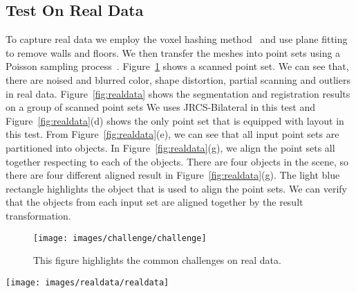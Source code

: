 \subsection{Test On Real Data}
To capture real data we employ the voxel hashing method~\cite{VXH} and use plane fitting to remove walls and floors. 
%
We then transfer the meshes into point sets using a Poisson sampling process~\cite{PossionSampling}.
%
Figure~\ref{fig:challenge} shows a scanned point set. We can see that, there are noised and blurred color, shape distortion, partial scanning and outliers in real data.
%
Figure~\ref{fig:realdata} shows the segmentation and registration results on a group of scanned point sets We uses JRCS-Bilateral in this test and Figure~\ref{fig:realdata}(d) shows the only point set that is equipped with layout in this test.
From Figure~\ref{fig:realdata}(e), we can see that all input point sets are partitioned into objects. In Figure~\ref{fig:realdata}(g), we align the point sets all together respecting to each of the objects. There are four objects in the scene, so there are four different aligned result in Figure~\ref{fig:realdata}(g). The light blue rectangle highlights the object that is used to align the point sets. We can verify that the objects from each input set are aligned together by the result transformation.
\begin{figure}
	\centering
	\texttt{[image: images/challenge/challenge]}
	\caption{\label{fig:challenge}This figure highlights the common challenges on real data.}
\end{figure}
\begin{figure*}
	\centering
	\texttt{[image: images/realdata/realdata]}
	\caption{\label{fig:realdata} Segmentation and registration on real data. (a) Scanned mesh using method in \cite{VXH}. (b) Remove walls and floors by plane fitting. (c) Sampled point set using \cite{PossionSampling}. (d) With roughly placed boxes on only one point set, the points are initially segmented in this one point set. Note that parts of the chair legs are segmented to the table due to the rough box placement by users. (e) Pairs of input point sets and corresponding segmentation results. (f) The final Gaussian centroids for the five objects in the scene. (g) Verification of the registration result by aligning all point sets with respect to each object. The light blue rectangle highlights the object that is aligned together. Except the aligned object, the other objects are placed quite messy since they came from different point sets and have different arrangement relative to the aligned object. %
	}
\end{figure*} 
